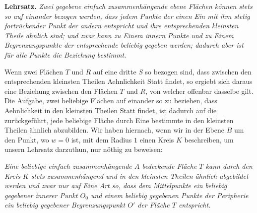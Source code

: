 \documentclass[12pt,a4paper]{book}
\theoremstyle{definition}
\theoremstyle{remark}
\begin{document}
\medskip
\noindent\textbf{Lehrsatz.} \textit{Zwei gegebene einfach zusammenhängende ebene Flächen können stets so auf einander bezogen werden, dass jedem Punkte der einen Ein mit ihm stetig fortrückender Punkt der andern entspricht und ihre entsprechenden kleinsten Theile ähnlich sind; und zwar kann zu Einem innern Punkte und zu Einem Begrenzungspunkte der entsprechende beliebig gegeben werden; dadurch aber ist für alle Punkte die Beziehung bestimmt.}
\medskip

Wenn zwei Flächen $T$ und $R$ auf eine dritte $S$ so bezogen sind, dass zwischen den entsprechenden kleinsten Theilen Aehnlichkeit Statt findet, so ergiebt sich daraus eine Beziehung zwischen den Flächen $T$ und $R$, von welcher offenbar dasselbe gilt. Die Aufgabe, zwei beliebige Flächen auf einander so zu beziehen, dass Aehnlichkeit in den kleinsten Theilen Statt findet, ist dadurch auf die zurückgeführt, jede beliebige Fläche durch Eine bestimmte in den kleinsten Theilen ähnlich abzubilden. Wir haben hiernach, wenn wir in der Ebene $B$ um den Punkt, wo $w = 0$ ist, mit dem Radius $1$ einen Kreis $K$ beschreiben, um unsern Lehrsatz darzuthun, nur nöthig zu beweisen:

\medskip
\noindent\textit{Eine beliebige einfach zusammenhängende $A$ bedeckende Fläche $T$ kann durch den Kreis $K$ stets zusammenhängend und in den kleinsten Theilen ähnlich abgebildet werden und zwar nur auf Eine Art so, dass dem Mittelpunkte ein beliebig gegebener innerer Punkt $O_0$ und einem beliebig gegebenen Punkte der Peripherie ein beliebig gegebener Begrenzungspunkt $O'$ der Fläche $T$ entspricht.}
\medskip
\end{document}
